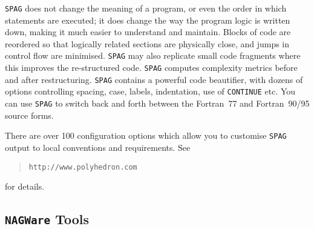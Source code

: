 \documentclass[a4paper,titlepage,11pt]{article}
\begin{document}
{\tt SPAG} does not change the meaning of a program, or even the order in which statements are executed; it does change the way the program logic is written down, making it much easier to understand and maintain. Blocks of code are reordered so that logically related sections are physically close, and jumps in control flow are minimised. {\tt SPAG} may also replicate small code fragments where this improves the re-structured code. {\tt SPAG} computes complexity metrics before and after restructuring. 
{\tt SPAG} contains a powerful code beautifier, with dozens of options controlling spacing, case, labels, indentation, use of {\tt CONTINUE} etc. You can use {\tt SPAG} to switch back and forth between the Fortran~77 and Fortran~90/95 source forms.

There are over 100 configuration options which allow you to customise {\tt SPAG} output to local conventions and requirements. See 
\begin{quote}
{\tt http://www.polyhedron.com}
\end{quote}
 for details.

\subsection{{\tt NAGWare} Tools}
\end{document}
